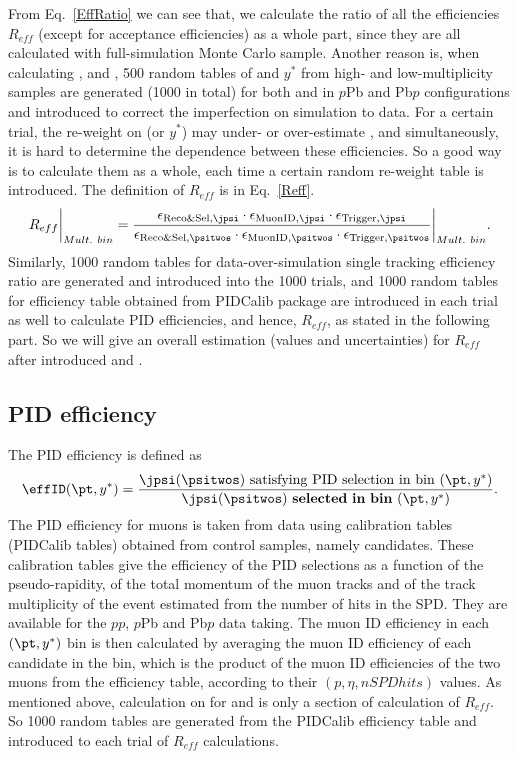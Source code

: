 From Eq.~\ref{EffRatio} we can see that, we calculate the ratio of all the efficiencies $R_{eff}$ (except for acceptance efficiencies) as a whole part, since they are all calculated with full-simulation Monte Carlo sample. Another reason is, when calculating \effReco, \effID and \effTrigger, 500 random tables of \pt and $y^*$ from high- and low-multiplicity samples are generated (1000 in total) for both \jpsi and \psitwos in $p$Pb and Pb$p$ configurations and introduced to correct the imperfection on simulation to data. For a certain trial, the re-weight on \pt (or $y^*$) may under- or over-estimate  \effReco, \effID and \effTrigger simultaneously, it is hard to determine the dependence between these efficiencies. So a good way is to calculate them as a whole, each time a certain random re-weight table is introduced. The definition of $R_{eff}$ is in Eq.~\ref{Reff}.
\begin{equation}
R_{eff}\bigg|_{Mult. \ bin} = 
\frac{\ensuremath{\epsilon_{\mathrm{Reco\&Sel,\jpsi}}}\cdot\ensuremath{\epsilon_{\mathrm{MuonID,\jpsi}}}\cdot\ensuremath{\epsilon_{\mathrm{Trigger,\jpsi}}}}{\ensuremath{\epsilon_{\mathrm{Reco\&Sel,\psitwos}}}\cdot\ensuremath{\epsilon_{\mathrm{MuonID,\psitwos}}}\cdot\ensuremath{\epsilon_{\mathrm{Trigger,\psitwos}}}}\bigg|_{Mult. \ bin}.
\label{Reff}
\end{equation}
Similarly, 1000 random tables for data-over-simulation single tracking efficiency ratio are generated and introduced into the 1000 trials, and 1000 random tables for efficiency table obtained from PIDCalib package are introduced in each trial as well to calculate PID efficiencies, and hence, $R_{eff}$, as stated in the following part. So we will give an overall estimation (values and uncertainties) for $R_{eff}$ after introduced \effID and \effTrigger.

\subsection{PID efficiency}
The PID efficiency is defined as 
\begin{equation}
    \effID(\pt,y^*)=\frac{\jpsi(\psitwos) \mathrm{ \ satisfying \ PID \ selection \ in \ bin \ }(\pt,y^*)}{\jpsi(\psitwos)\mathbf{ \ selected \ in \ bin \ }(\pt,y^*)}.
\end{equation}
The PID efficiency for muons is taken from data using calibration tables (PIDCalib tables) obtained from control samples, namely \jpsi candidates. These calibration tables give the efficiency of the PID selections as a function of the pseudo-rapidity, of the total momentum of the muon tracks and of the track multiplicity of the event estimated from the number of hits in the SPD. They are available for the $pp$, $p$Pb and Pb$p$ data taking. 
The muon ID efficiency in each $(\pt,y^*)$ bin is then calculated by averaging the muon ID efficiency of each candidate in the bin, which is the product of the muon ID efficiencies of the two muons from the efficiency table, according to their $(p, \eta, nSPDhits)$ values. As mentioned above, calculation on \effID for \jpsi and \psitwos is only a section of calculation of $R_{eff}$. So 1000 random tables are generated from the PIDCalib efficiency table and introduced to each trial of $R_{eff}$ calculations.

